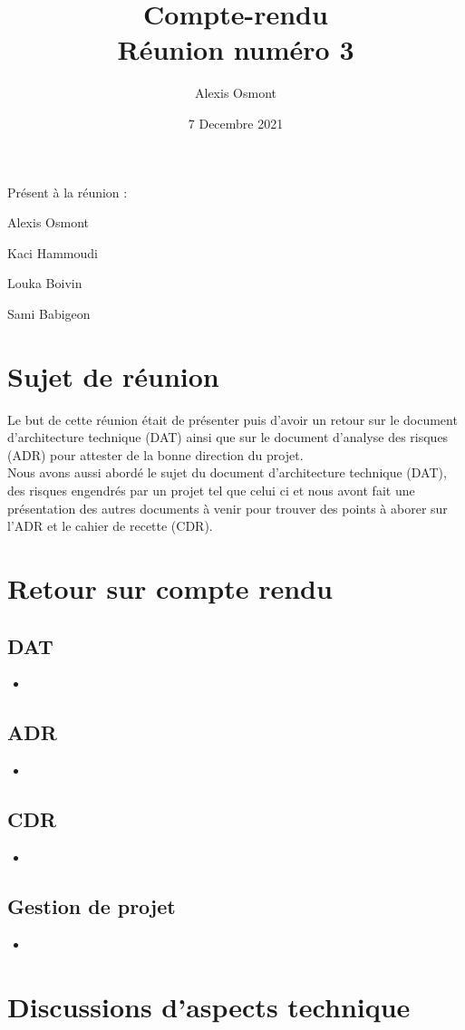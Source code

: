 \documentclass{article}
\title{
    \Huge
    Compte-rendu\\
    Réunion numéro 3\\
}
\date{\huge 7 Decembre 2021}
\author{\huge Alexis Osmont\\}
\begin{document}
\maketitle
\vspace{5cm}
    Présent à la réunion :
    \begin{description}
        \item Alexis Osmont
        \item Kaci Hammoudi
        \item Louka  Boivin
        \item Sami Babigeon
    \end{description}
\newpage

\section{Sujet de réunion}   

Le but de cette réunion était de présenter puis d'avoir un retour sur le document d'architecture technique (DAT) ainsi que sur le document d'analyse des risques (ADR) pour attester de la bonne direction du projet.\\

Nous avons aussi abordé le sujet du document d'architecture technique (DAT), des risques engendrés par un projet tel que celui ci et nous avont fait une présentation des autres documents à venir 
pour trouver des points à aborer sur l'ADR et le cahier de recette (CDR).
\vspace{0.5cm}

\section{Retour sur compte rendu}
\subsection{DAT}

\begin{itemize}
    \item 
\end{itemize}

\subsection{ADR}

\begin{itemize}
    \item 
\end{itemize}

\subsection{CDR}

\begin{itemize}
    \item 
\end{itemize}

\subsection{Gestion de projet}
\begin{itemize}
    \item

\end{itemize}
\section{Discussions d'aspects technique}


\newpage
\end{document}
